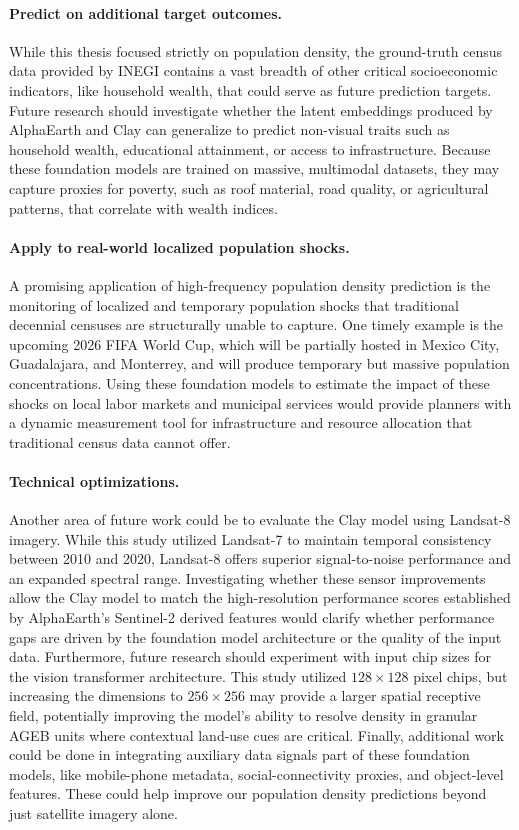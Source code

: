 \documentclass[12pt,letterpaper]{article}
\begin{document}
\paragraph{Predict on additional target outcomes.} 
While this thesis focused strictly on population density, the ground-truth census data provided by INEGI contains a vast breadth of other critical socioeconomic indicators, like household wealth, that could serve as future prediction targets. Future research should investigate whether the latent embeddings produced by AlphaEarth and Clay can generalize to predict non-visual traits such as household wealth, educational attainment, or access to infrastructure. Because these foundation models are trained on massive, multimodal datasets, they may capture proxies for poverty, such as roof material, road quality, or agricultural patterns, that correlate with wealth indices. 

\paragraph{Apply to real-world localized population shocks.}
A promising application of high-frequency population density prediction is the monitoring of localized and temporary population shocks that traditional decennial censuses are structurally unable to capture. One timely example is the upcoming 2026 FIFA World Cup, which will be partially hosted in Mexico City, Guadalajara, and Monterrey, and will produce temporary but massive population concentrations. Using these foundation models to estimate the impact of these shocks on local labor markets and municipal services would provide planners with a dynamic measurement tool for infrastructure and resource allocation that traditional census data cannot offer.

\paragraph{Technical optimizations.}
Another area of future work could be to evaluate the Clay model using Landsat-8 imagery. While this study utilized Landsat-7 to maintain temporal consistency between 2010 and 2020, Landsat-8 offers superior signal-to-noise performance and an expanded spectral range. Investigating whether these sensor improvements allow the Clay model to match the high-resolution performance scores established by AlphaEarth's Sentinel-2 derived features would clarify whether performance gaps are driven by the foundation model architecture or the quality of the input data. Furthermore, future research should experiment with input chip sizes for the vision transformer architecture. This study utilized $128 \times 128$ pixel chips, but increasing the dimensions to $256 \times 256$ may provide a larger spatial receptive field, potentially improving the model's ability to resolve density in granular AGEB units where contextual land-use cues are critical. Finally, additional work could be done in integrating auxiliary data signals part of these foundation models, like mobile-phone metadata, social-connectivity proxies, and object-level features. These could help improve our population density predictions beyond just satellite imagery alone.
\end{document}
